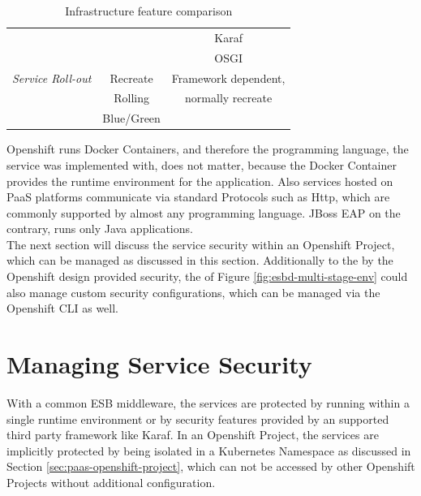 {\begin{table}[h]
\begin{tabularx}{\textwidth}{ X|c|c }
			                                                     && Karaf \\  
			                                                     && OSGI \\  \hline
	  \textit{Service Roll-out}         & Recreate                & Framework dependent, \\ 
			                            & Rolling                 & normally recreate \\
			                            & Blue/Green              & \\  \hline
	\end{tabularx}
	\caption{Infrastructure feature comparison}
	\label{tab:esbd-multi-stage-env}
\end{table}}

Openshift runs Docker Containers, and therefore the programming language, the service was implemented with, does not matter, because the Docker Container provides the runtime environment for the application. Also services hosted on PaaS platforms communicate via standard Protocols such as Http, which are commonly supported by almost any programming language. JBoss EAP on the contrary, runs only Java applications. \\ 

The next section will discuss the service security within an Openshift Project, which can be managed as discussed in this section. Additionally to the by the Openshift design provided security, the  of Figure \vref{fig:esbd-multi-stage-env} could also manage custom security configurations, which can be managed via the Openshift CLI as well. 

\section{Managing Service Security}
\label{sec:esbd-service-security}
With a common ESB middleware, the services are protected by running within a single runtime environment or by security features provided by an supported third party framework like Karaf. In an Openshift Project, the services are implicitly protected by being isolated in a Kubernetes Namespace as discussed in Section \vref{sec:paas-openshift-project}, which can not be accessed by other Openshift Projects without additional configuration.


